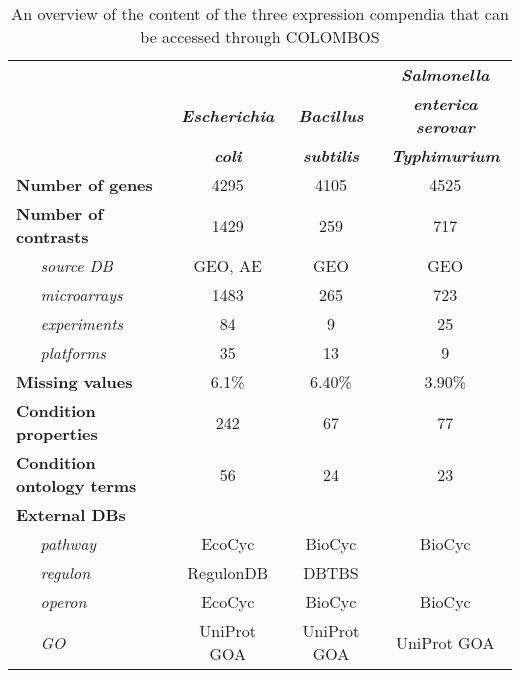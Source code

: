\begin{table}
	\caption{An overview of the content of the three expression compendia that can be accessed through COLOMBOS}
	\label{tab:colTB-overview}
	\begin{small}
	\begin{tabular}{l | c c c}
	\toprule
	& & & {\bf\it\small Salmonella} \\
	& {\bf\it\small Escherichia} & {\bf\it\small Bacillus} & {\bf\it\small enterica serovar} \\
	& {\bf\it\small coli} & {\bf\it\small subtilis} & {\bf\it\small  Typhimurium} \\
	\midrule
	{\bf Number of genes} & 4295 & 4105 & 4525 \\
	{\bf Number of contrasts} & 1429 & 259 & 717 \\
	{\it ~~~source DB} & GEO, AE & GEO & GEO \\
	{\it ~~~microarrays} & 1483 & 265 & 723 \\
	{\it ~~~experiments} & 84 & 9 & 25 \\
	{\it ~~~platforms} & 35 & 13 & 9 \\
	{\bf Missing values} & 6.1\% & 6.40\% & 3.90\% \\
	{\bf Condition properties} & 242 & 67 & 77 \\
	{\bf Condition ontology terms} & 56 & 24 & 23 \\
	{\bf External DBs} & & & \\
	{\it ~~~pathway} & EcoCyc & BioCyc & BioCyc \\
	{\it ~~~regulon} & RegulonDB & DBTBS & \\
	{\it ~~~operon} & EcoCyc & BioCyc & BioCyc \\
	{\it ~~~GO} & UniProt GOA & UniProt GOA & UniProt GOA \\
	\bottomrule
	\end{tabular}
	\end{small}
\end{table}



